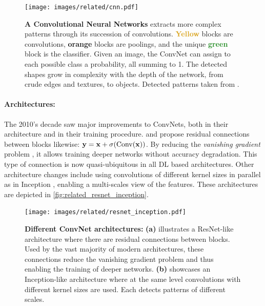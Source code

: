 \begin{figure}[tb]
      \begin{center}
            \texttt{[image: images/related/cnn.pdf]}
      \end{center}
      \caption{\textbf{A Convolutional Neural Networks} extracts more complex patterns through its
            succession of convolutions. \textcolor{Goldenrod}{\textbf{Yellow}} blocks are
            convolutions, \textcolor{BurntOrange}{\textbf{orange}} blocks are poolings, and the
            unique \textcolor{ForestGreen}{\textbf{green}} block is the classifier. Given an image,
            the \ac{ConvNet} can assign to each possible class a probability, all summing to 1. The
            detected shapes grow in complexity with the depth of the network, from crude edges and
            textures, to objects. Detected patterns taken from \citet{olah2017feature}.}
      \label{fig:related_cnn}
\end{figure}

\paragraph{Architectures:}The 2010's decade saw major improvements to \acp{ConvNet}, both in their
architecture and in their training procedure. \citet{srivastava2015highwaynet} and
\citet{he2016resnet} propose residual connections between blocks likewise: $\mathbf{y} = \mathbf{x} +
      \sigma(\operatorname{Conv}(\mathbf{x}))$. By reducing the \textit{vanishing gradient} problem
\citep{hochreiter2001vanishinggrad}, it allows training deeper networks without accuracy
degradation. This type of connection is now quasi-ubiquitous in all \ac{DL} based architectures.
Other architecture changes include using convolutions of different kernel sizes in parallel as in
Inception \citep{szegedy2015inception}, enabling a multi-scales view of the features. These
architectures are depicted in \autoref{fig:related_resnet_inception}.

\begin{figure}[tb]
      \begin{center}
            \texttt{[image: images/related/resnet\_inception.pdf]}
      \end{center}
      \caption{\textbf{Different ConvNet architectures:} \textbf{(a)} illustrates a ResNet-like
            architecture where there are residual connections between blocks. Used by the vast
            majority of modern architectures, these connections reduce the vanishing gradient problem
            and thus enabling the training of deeper networks. \textbf{(b)} showcases an Inception-like
            architecture where at the same level convolutions with different kernel sizes are used.
            Each detects patterns of different scales.}
      \label{fig:related_resnet_inception}
\end{figure}

